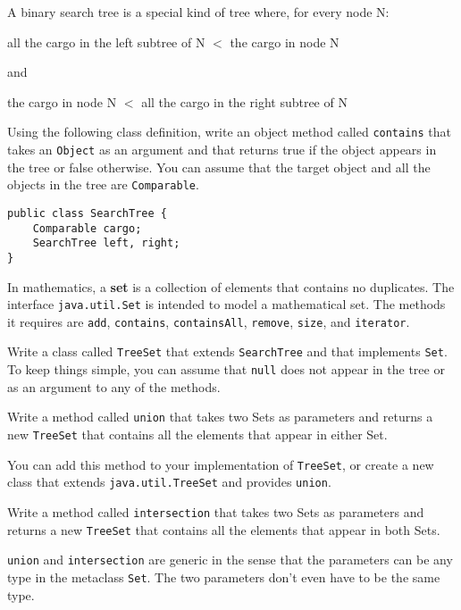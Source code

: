 \begin{exercise}
\label{ex.searchtree}
A binary search tree is a special kind of tree where,
for every node N:

\vspace{0.1in}
all the cargo in the left subtree of N $<$ the cargo in node N

and

the cargo in node N $<$ all the cargo in the right subtree of N
\vspace{0.1in}

Using the following class definition, write an object method called
{\tt contains} that takes an {\tt Object} as an argument and that
returns true if the object appears in the tree or false otherwise.
You can assume that the target object and all the objects in the
tree are {\tt Comparable}.

\begin{verbatim}
public class SearchTree {
    Comparable cargo;
    SearchTree left, right;
}
\end{verbatim}
\end{exercise}


\begin{exercise}
\label{ex.treeset}
In mathematics, a {\bf set} is a collection of elements that
contains no duplicates.
The interface {\tt java.util.Set} is intended to model a mathematical
set.  The methods it requires are {\tt add}, {\tt contains},
{\tt containsAll}, {\tt remove}, {\tt size}, and {\tt iterator}.

Write a class called {\tt TreeSet} that extends {\tt SearchTree}
and that implements {\tt Set}.  
To keep things simple, you can assume that {\tt null} does
not appear in the tree or as an argument to any of the methods.
\end{exercise}


\begin{exercise}
Write a method called {\tt union} that takes two Sets as
parameters and returns a new {\tt TreeSet} that contains all
the elements that appear in either Set.

You can add this method to your implementation of {\tt TreeSet},
or create a new class that extends {\tt java.util.TreeSet} and
provides {\tt union}.
\end{exercise}

\begin{exercise}
Write a method called {\tt intersection} that takes two Sets as
parameters and returns a new {\tt TreeSet} that contains all
the elements that appear in both Sets.

{\tt union} and {\tt intersection} are generic in the sense that
the parameters can be any type in the metaclass {\tt Set}.  The
two parameters don't even have to be the same type.
\end{exercise}


